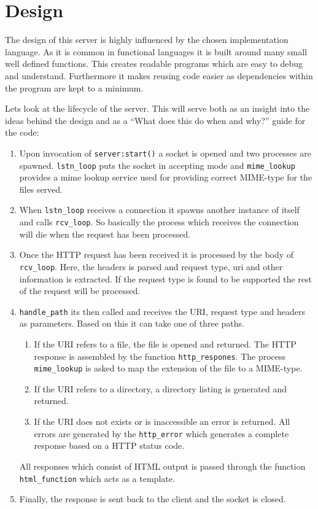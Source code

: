 \documentclass{sig-alternate}
\begin{document}
\section{Design}
The design of this server is highly influenced by the chosen
implementation language. As it is common in functional languages it is
built around many small well defined functions. This creates readable
programs which are easy to debug and understand. Furthermore it makes
reusing code easier as dependencies within the program are kept to a
minimum. 

Lets look at the lifecycle of the server. This will serve both as an
insight into the ideas behind the design and as a ``What does this
do when and why?'' guide for the code:
\begin{enumerate}
\item Upon invocation of \verb!server:start()! a socket is opened and
  two processes are spawned. \verb!lstn_loop! puts the socket in 
  accepting mode and \verb!mime_lookup! provides a mime lookup service
  used for providing correct MIME-type for the files served.
\item When \verb!lstn_loop! receives a connection it spawns another
  instance of itself and calls \verb!rcv_loop!. So basically the
  process which receives the connection will die when the request has
  been processed.
\item Once the HTTP request has been received it is processed by the
  body of \verb!rcv_loop!. Here, the headers is parsed and request
  type, uri and other information is extracted. If the request type is
  found to be supported the rest of the request will be processed.
\item \verb!handle_path! its then called and receives the URI, request
  type and headers as parameters. Based on this it can take one of
  three paths.
\begin{enumerate}
\item If the URI refers to a file, the file is opened and
  returned. The HTTP response is assembled by the function
  \verb!http_respones!. The process \verb!mime_lookup! is asked to map
  the extension of the file to a MIME-type.
\item If the URI refers to a directory, a directory listing is
  generated and returned.
\item If the URI does not exists or is inaccessible an error is
  returned. All errors are generated by the \verb!http_error! which generates
  a complete response based on a HTTP status code.
\end{enumerate}

All responses which consist of HTML output is passed through the
function \verb!html_function! which acts as a template.

\item Finally, the response is sent back to the client and the socket
  is closed.

\end{enumerate}
\end{document}
